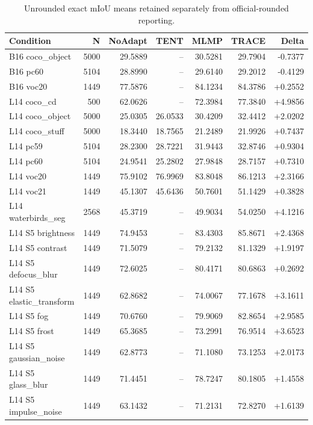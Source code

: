 \begin{table}[htbp]
\centering\scriptsize
\caption{Unrounded exact mIoU means retained separately from official-rounded reporting.}
\label{tab:exact}
\setlength{\tabcolsep}{4pt}
\begin{tabular}{lrrrrrr}
\toprule
Condition & N & NoAdapt & TENT & MLMP & TRACE & Delta \\
\midrule
B16 coco\_object & 5000 & 29.5889 & -- & 30.5281 & 29.7904 & -0.7377 \\
B16 pc60 & 5104 & 28.8990 & -- & 29.6140 & 29.2012 & -0.4129 \\
B16 voc20 & 1449 & 77.5876 & -- & 84.1234 & 84.3786 & +0.2552 \\
L14 coco\_cd & 500 & 62.0626 & -- & 72.3984 & 77.3840 & +4.9856 \\
L14 coco\_object & 5000 & 25.0305 & 26.0533 & 30.4209 & 32.4412 & +2.0202 \\
L14 coco\_stuff & 5000 & 18.3440 & 18.7565 & 21.2489 & 21.9926 & +0.7437 \\
L14 pc59 & 5104 & 28.2300 & 28.7221 & 31.9443 & 32.8746 & +0.9304 \\
L14 pc60 & 5104 & 24.9541 & 25.2802 & 27.9848 & 28.7157 & +0.7310 \\
L14 voc20 & 1449 & 75.9102 & 76.9969 & 83.8048 & 86.1213 & +2.3166 \\
L14 voc21 & 1449 & 45.1307 & 45.6436 & 50.7601 & 51.1429 & +0.3828 \\
L14 waterbirds\_seg & 2568 & 45.3719 & -- & 49.9034 & 54.0250 & +4.1216 \\
L14 S5 brightness & 1449 & 74.9453 & -- & 83.4303 & 85.8671 & +2.4368 \\
L14 S5 contrast & 1449 & 71.5079 & -- & 79.2132 & 81.1329 & +1.9197 \\
L14 S5 defocus\_blur & 1449 & 72.6025 & -- & 80.4171 & 80.6863 & +0.2692 \\
L14 S5 elastic\_transform & 1449 & 62.8682 & -- & 74.0067 & 77.1678 & +3.1611 \\
L14 S5 fog & 1449 & 70.6760 & -- & 79.9069 & 82.8654 & +2.9585 \\
L14 S5 frost & 1449 & 65.3685 & -- & 73.2991 & 76.9514 & +3.6523 \\
L14 S5 gaussian\_noise & 1449 & 62.8773 & -- & 71.1080 & 73.1253 & +2.0173 \\
L14 S5 glass\_blur & 1449 & 71.4451 & -- & 78.7247 & 80.1805 & +1.4558 \\
L14 S5 impulse\_noise & 1449 & 63.1432 & -- & 71.2131 & 72.8270 & +1.6139 \\

\end{tabular}
\end{table}
